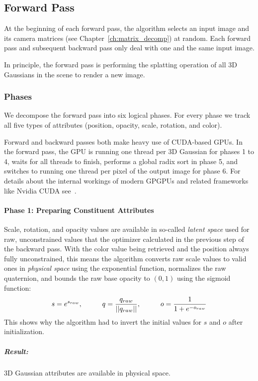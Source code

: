 \subsection{Forward Pass}
\label{ch:forwardpass}
At the beginning of each forward pass, the algorithm selects an input image and its camera matrices (see Chapter~\ref{ch:matrix_decomp}) at random. Each forward pass and subsequent backward pass only deal with one and the same input image.

In principle, the forward pass is performing the splatting operation of all 3D Gaussians in the scene to render a new image.

\subsubsection{Phases}
We decompose the forward pass into six logical phases. For every phase we track all five types of attributes (position, opacity, scale, rotation, and color). 

Forward and backward passes both make heavy use of CUDA-based GPUs. In the forward pass, the GPU is running one thread per 3D Gaussian for phases 1 to 4, waits for all threads to finish, performs a global radix sort in phase 5, and switches to running one thread per pixel of the output image for phase 6.
For details about the internal workings of modern GPGPUs and related frameworks like Nvidia CUDA see~\cite{oden2026APC}.

\vspace{-5pt}
\paragraph{Phase 1: Preparing Constituent Attributes} Scale, rotation, and opacity values are available in so-called \textit{latent space} used for raw, unconstrained values that the optimizer calculated in the previous step of the backward pass. With the color value being retrieved and the position always fully unconstrained, this means the algorithm converts raw scale values to valid ones in \textit{physical space} \cite{bengioRepresentationLearningReview2013} using the exponential function, normalizes the raw quaternion, and bounds the raw base opacity to $(0,1)$ using the sigmoid function:
\vspace{-5pt}
$$
s = e^{s_{raw}},
\hspace{1cm}
q = \frac{q_{raw}}{\vert{}\vert{}q_{raw}\vert{}\vert{}},
\hspace{1cm}
o = \frac{1}{1 + e^{-o_{raw}}}
\vspace{-5pt} 
$$
This shows why the algorithm had to invert the initial values for $s$ and $o$ after initialization. 
\subparagraph{Result:} 3D Gaussian attributes are available in physical space.

